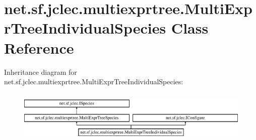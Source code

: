 \hypertarget{classnet_1_1sf_1_1jclec_1_1multiexprtree_1_1_multi_expr_tree_individual_species}{\section{net.\-sf.\-jclec.\-multiexprtree.\-Multi\-Expr\-Tree\-Individual\-Species Class Reference}
\label{classnet_1_1sf_1_1jclec_1_1multiexprtree_1_1_multi_expr_tree_individual_species}
}
Inheritance diagram for net.\-sf.\-jclec.\-multiexprtree.\-Multi\-Expr\-Tree\-Individual\-Species\-:\begin{figure}[H]
\begin{center}
\leavevmode
\includegraphics[height=2.470588cm]{classnet_1_1sf_1_1jclec_1_1multiexprtree_1_1_multi_expr_tree_individual_species}
\end{center}
\end{figure}

